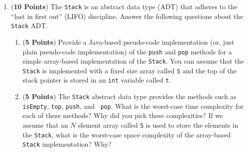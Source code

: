\documentclass[12pt]{article}
\begin{document}
\begin{enumerate}
\begin{enumerate}

        \end{enumerate}

        \newpage

      \item ({\bf 10 Points}) The {\tt Stack} is an abstract data type (ADT)
        that adheres to the ``last in first out'' (LIFO) discipline.  Answer
        the following questions about the {\tt Stack} ADT.

        \begin{enumerate}

          \item ({\bf 5 Points}) Provide a Java-based pseudo-code
            implementation (or, just plain pseudo-code implementation) of the
            {\tt push} and {\tt pop} methods for a simple array-based
            implementation of the {\tt Stack}.  You can assume that the {\tt
              Stack} is implemented with a fixed size array called {\tt S} and
            the top of the stack pointer is stored in an {\tt int} variable
            called {\tt t}.

          \item ({\bf 5 Points}) The {\tt Stack} abstract data type provides
            the methods such as {\tt isEmpty}, {\tt top}, {\tt push}, and {\tt
              pop}.  What is the worst-case time complexity for each of these
            methods?  Why did you pick these complexities? If we assume that
            an $N$ element array called {\tt S} is used to store the elements
            in the {\tt Stack}, what is the worst-case space complexity of the
            array-based {\tt Stack} implementation? Why?


        \end{enumerate}


\end{enumerate}
\end{document}

